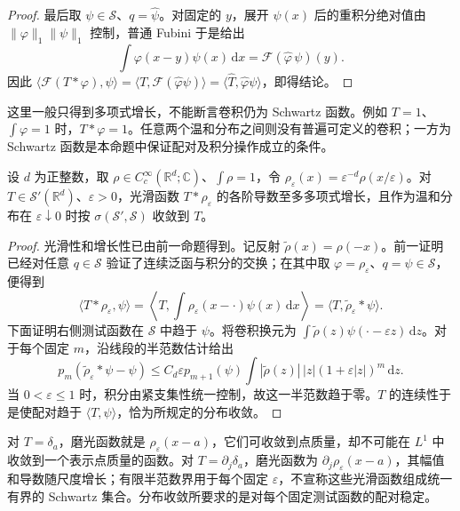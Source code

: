 \begin{proof}
最后取 \(\psi\in\mathcal S\)、\(q=\widehat\psi\)。对固定的 \(y\)，展开 \(\widehat\psi(x)\) 后的重积分绝对值由 \(\|\varphi\|_1\|\psi\|_1\) 控制，普通 Fubini 于是给出
\[
 \int\varphi(x-y)\widehat\psi(x)\,\mathrm{d}x
 =\mathcal F(\widehat\varphi\,\psi)(y).
\]
因此 \(\langle\mathcal F(T*\varphi),\psi\rangle=\langle T,\mathcal F(\widehat\varphi\psi)\rangle=\langle\widehat T,\widehat\varphi\psi\rangle\)，即得结论。
\end{proof}

这里一般只得到多项式增长，不能断言卷积仍为 Schwartz 函数。例如 \(T=1\)、\(\int\varphi=1\) 时，\(T*\varphi=1\)。任意两个温和分布之间则没有普遍可定义的卷积；一方为 Schwartz 函数是本命题中保证配对及积分操作成立的条件。

\begin{proposition}[温和分布的磨光]\label{b2:prop:05-tempered-regularization}
设 \(d\) 为正整数，取 \(\rho\in C_c^\infty(\mathbb R^d;\mathbb C)\)、\(\int\rho=1\)，令 \(\rho_\varepsilon(x)=\varepsilon^{-d}\rho(x/\varepsilon)\)。对 \(T\in\mathcal S'(\mathbb R^d)\)、\(\varepsilon>0\)，光滑函数 \(T*\rho_\varepsilon\) 的各阶导数至多多项式增长，且作为温和分布在 \(\varepsilon\downarrow0\) 时按 \(\sigma(\mathcal S',\mathcal S)\) 收敛到 \(T\)。
\end{proposition}
\begin{proof}
光滑性和增长性已由前一命题得到。记反射 \(\widetilde\rho(x)=\rho(-x)\)。前一证明已经对任意 \(q\in\mathcal S\) 验证了连续泛函与积分的交换；在其中取 \(\varphi=\rho_\varepsilon\)、\(q=\psi\in\mathcal S\)，便得到
\[
 \langle T*\rho_\varepsilon,\psi\rangle
 =\left\langle T,\int\rho_\varepsilon(x-\cdot)\psi(x)\,\mathrm{d}x\right\rangle
 =\langle T,\widetilde\rho_\varepsilon*\psi\rangle.
\]
下面证明右侧测试函数在 \(\mathcal S\) 中趋于 \(\psi\)。将卷积换元为 \(\int\widetilde\rho(z)\psi(\cdot-\varepsilon z)\,\mathrm{d}z\)。对于每个固定 \(m\)，沿线段的半范数估计给出
\[
 p_m(\widetilde\rho_\varepsilon*\psi-\psi)
 \leq C_d\varepsilon p_{m+1}(\psi)
       \int|\widetilde\rho(z)|\,|z|(1+\varepsilon|z|)^m\,\mathrm{d}z.
\]
当 \(0<\varepsilon\leq1\) 时，积分由紧支集性统一控制，故这一半范数趋于零。\(T\) 的连续性于是使配对趋于 \(\langle T,\psi\rangle\)，恰为所规定的分布收敛。
\end{proof}

对 \(T=\delta_a\)，磨光函数就是 \(\rho_\varepsilon(x-a)\)，它们可收敛到点质量，却不可能在 \(L^1\) 中收敛到一个表示点质量的函数。对 \(T=\partial_j\delta_a\)，磨光函数为 \(\partial_j\rho_\varepsilon(x-a)\)，其幅值和导数随尺度增长；有限半范数界用于每个固定 \(\varepsilon\)，不宣称这些光滑函数组成统一有界的 Schwartz 集合。分布收敛所要求的是对每个固定测试函数的配对稳定。
